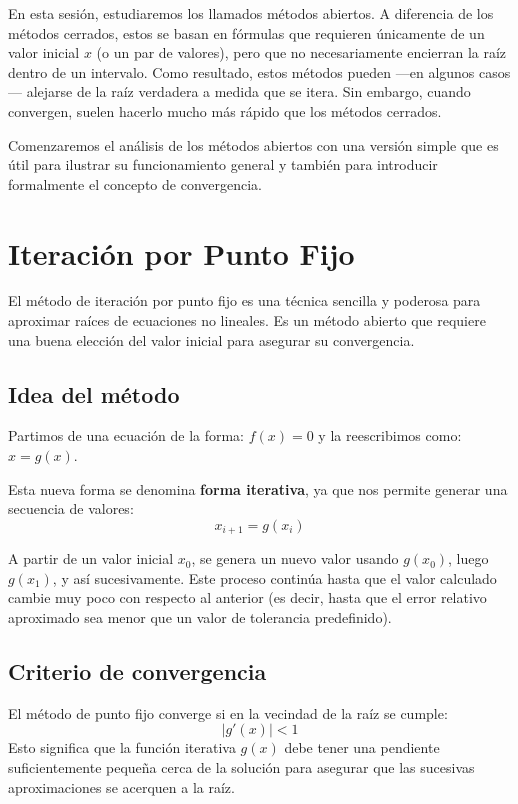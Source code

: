 \documentclass[12pt,letterpaper]{article}
\theoremstyle{definition}
\theoremstyle{plain}
\theoremstyle{remark}
\begin{document}
En esta sesión, estudiaremos los llamados métodos abiertos. A diferencia de los métodos cerrados, estos se basan en fórmulas que requieren únicamente de un valor inicial $x$ (o un par de valores), pero que no necesariamente encierran la raíz dentro de un intervalo. Como resultado, estos métodos pueden —en algunos casos— alejarse de la raíz verdadera a medida que se itera. Sin embargo, cuando convergen, suelen hacerlo mucho más rápido que los métodos cerrados.

Comenzaremos el análisis de los métodos abiertos con una versión simple que es útil para ilustrar su funcionamiento general y también para introducir formalmente el concepto de convergencia.

\section{Iteración por Punto Fijo}

El método de iteración por punto fijo es una técnica sencilla y poderosa para aproximar raíces de ecuaciones no lineales. Es un método abierto que requiere una buena elección del valor inicial para asegurar su convergencia.

\subsection*{Idea del método}

Partimos de una ecuación de la forma:
\(f(x) = 0\) y la reescribimos como:
\(x = g(x).\)

Esta nueva forma se denomina {\bf forma iterativa}, ya que nos permite generar una secuencia de valores:
\[
x_{i+1} = g(x_i)
\]

A partir de un valor inicial $x_0$, se genera un nuevo valor usando $g(x_0)$, luego $g(x_1)$, y así sucesivamente. Este proceso continúa hasta que el valor calculado cambie muy poco con respecto al anterior (es decir, hasta que el error relativo aproximado sea menor que un valor de tolerancia predefinido).

\subsection*{Criterio de convergencia}

El método de punto fijo converge si en la vecindad de la raíz se cumple:
\[
|g'(x)| < 1
\]
Esto significa que la función iterativa $g(x)$ debe tener una pendiente suficientemente pequeña cerca de la solución para asegurar que las sucesivas aproximaciones se acerquen a la raíz.
\end{document}
